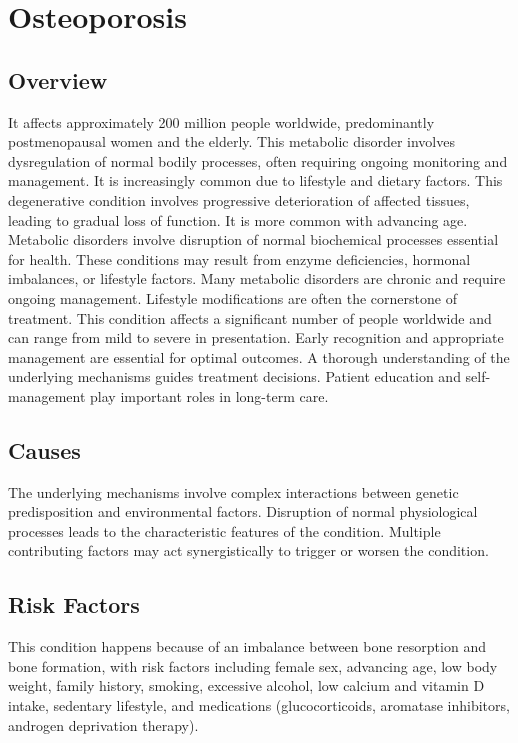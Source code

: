\chapter{Osteoporosis}
\label{sec:Osteoporosis}

\section{Overview}
It affects approximately 200 million people worldwide, predominantly postmenopausal women and the elderly. This metabolic disorder involves dysregulation of normal bodily processes, often requiring ongoing monitoring and management. It is increasingly common due to lifestyle and dietary factors. This degenerative condition involves progressive deterioration of affected tissues, leading to gradual loss of function. It is more common with advancing age. Metabolic disorders involve disruption of normal biochemical processes essential for health. These conditions may result from enzyme deficiencies, hormonal imbalances, or lifestyle factors. Many metabolic disorders are chronic and require ongoing management. Lifestyle modifications are often the cornerstone of treatment. This condition affects a significant number of people worldwide and can range from mild to severe in presentation. Early recognition and appropriate management are essential for optimal outcomes. A thorough understanding of the underlying mechanisms guides treatment decisions. Patient education and self-management play important roles in long-term care.
\section{Causes}
The underlying mechanisms involve complex interactions between genetic predisposition and environmental factors. Disruption of normal physiological processes leads to the characteristic features of the condition. Multiple contributing factors may act synergistically to trigger or worsen the condition.
\section{Risk Factors}
This condition happens because of an imbalance between bone resorption and bone formation, with risk factors including female sex, advancing age, low body weight, family history, smoking, excessive alcohol, low calcium and vitamin D intake, sedentary lifestyle, and medications (glucocorticoids, aromatase inhibitors, androgen deprivation therapy).

